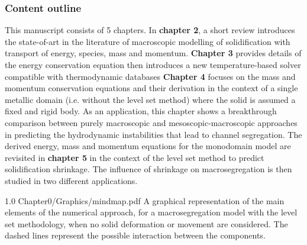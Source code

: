 \subsubsection{Content outline}
This manuscript consists of 5 chapters. In \textbf{chapter 2}, a short review introduces the state-of-art in the literature of 
macroscopic modelling of solidification with transport of energy, species, mass and momentum. \textbf{Chapter 3} provides details
of the energy conservation equation then introduces a new temperature-based solver compatible with thermodynamic databases
\textbf{Chapter 4} focuses on the mass and momentum conservation equations 
and their derivation in the context of a single metallic domain (i.e. without 
the level set method) where the solid is assumed a fixed and rigid body. As an 
application, this chapter shows a breakthrough comparison between purely macroscopic 
and mesoscopic-macroscopic approaches in predicting the hydrodynamic instabilities 
that lead to channel segregation.
The derived energy, mass and momentum equations for the monodomain model are revisited 
in \textbf{chapter 5} in the context of the level set method to predict solidification shrinkage.
The influence of shrinkage on macrosegregation is then studied in two different applications.

\begin{figureth}
{1.0}
{Chapter0/Graphics/mindmap.pdf}
{A graphical representation of the main elements of the numerical approach, 
for a macrosegregation model with the level set methodology, when no solid deformation or movement are considered. 
The dashed lines represent the possible interaction between the components.}
\label{fig:mindmap}
\end{figureth}

